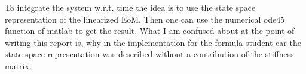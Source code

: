 To integrate the system w.r.t. time the idea is to use the state space representation of the linearized EoM. Then one can use the numerical ode45 function of matlab to get the result. What I am confused about at the point of writing this report is, why in the implementation for the formula student car the state space representation was described without a contribution of the stiffness matrix.